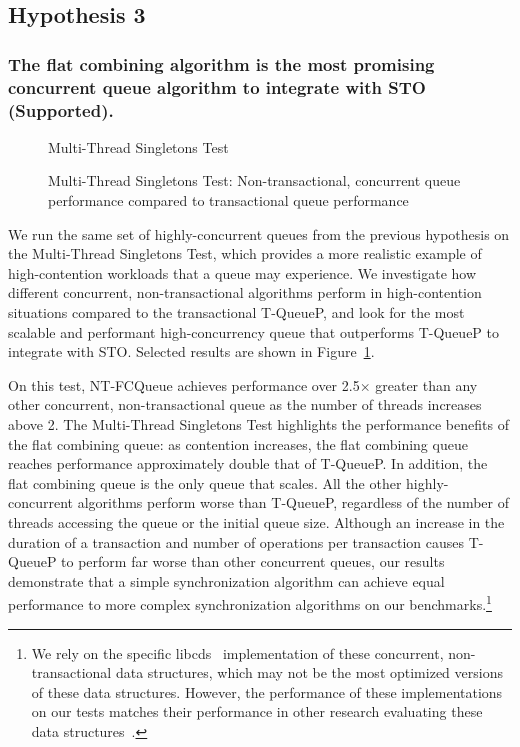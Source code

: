 \newpage
\subsection{Hypothesis 3}
\subsubsection{The flat combining algorithm is the most promising concurrent queue algorithm to integrate with STO (Supported).}
\label{eval:hypo3}

\begin{figure}[ht!]
    \centering
   	\begin{minipage}{0.75\textwidth}
        \caption*{Multi-Thread Singletons Test}
	\end{minipage}
    \caption{Multi-Thread Singletons Test: Non-transactional, concurrent queue performance compared to transactional queue performance}
    \label{fig:ntqs}
\end{figure}

We run the same set of highly-concurrent queues from the previous hypothesis on the Multi-Thread Singletons Test, which provides a more realistic example of high-contention workloads that a queue may experience. We investigate how different concurrent, non-transactional algorithms perform in high-contention situations compared to the transactional T-QueueP, and look for the most scalable and performant high-concurrency queue that outperforms T-QueueP to integrate with STO. Selected results are shown in Figure~\ref{fig:ntqs}.

On this test, NT-FCQueue achieves performance over 2.5$\times$ greater than any other concurrent, non-transactional queue as the number of threads increases above 2. The Multi-Thread Singletons Test highlights the performance benefits of the flat combining queue: as contention increases, the flat combining queue reaches performance approximately double that of T-QueueP. In addition, the flat combining queue is the only queue that scales. All the other highly-concurrent algorithms perform worse than T-QueueP, regardless of the number of threads accessing the queue or the initial queue size. 
Although an increase in the duration of a transaction and number of operations per transaction causes T-QueueP to perform far worse than other concurrent queues, our results demonstrate that a simple synchronization algorithm can achieve equal performance to more complex synchronization algorithms on our benchmarks.\footnote{We rely on the specific libcds~\cite{libcds} implementation of these concurrent, non-transactional data structures, which may not be the most optimized versions of these data structures. However, the performance of these implementations on our tests matches their performance in other research evaluating these data structures~\cite{queue1, queue3}.}

